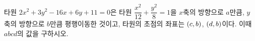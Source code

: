 타원 $2x^2+3y^2-16x+6y+11=0$은 타원 $\dfrac{x^2}{12}+\dfrac{y^2}{8}=1$을 $x$축의 방향으로 $a$만큼, $y$축의 방향으로 $b$만큼 평행이동한 것이고, 타원의 초점의 좌표는 $(c{,}\mkern3mu\mathopen{}b)$, $(d{,}\mkern3mu\mathopen{}b)$이다. 이때 $abcd$의 값을 구하시오.

